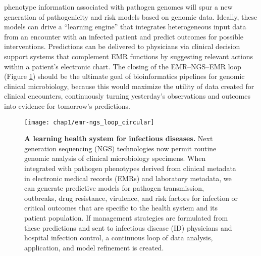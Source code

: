  phenotype information associated with pathogen genomes will spur a new generation of pathogenicity and risk models based on genomic data. Ideally, these models can drive a “learning engine” that integrates heterogeneous input data from an encounter with an infected patient and predict outcomes for possible interventions. Predictions can be delivered to physicians via clinical decision support systems that complement EMR functions by suggesting relevant actions within a patient’s electronic chart. The closing of the EMR–NGS–EMR loop (Figure \ref{fig:emr_ngs_loop}) should be the ultimate goal of bioinformatics pipelines for genomic clinical microbiology, because this would maximize the utility of data created for clinical encounters, continuously turning yesterday’s observations and outcomes into evidence for tomorrow’s predictions.

\begin{figure}[htb]
  \texttt{[image: chap1/emr-ngs\_loop\_circular]}               
  \caption[A learning health system for infectious diseases]{\textbf{A learning health system for infectious diseases.} Next generation sequencing (NGS) technologies now permit routine genomic analysis of clinical microbiology specimens. When integrated with pathogen phenotypes derived from clinical metadata in electronic medical records (EMRs) and laboratory metadata, we can generate predictive models for pathogen transmission, outbreaks, drug resistance, virulence, and risk factors for infection or critical outcomes that are specific to the health system and its patient population. If management strategies are formulated from these predictions and sent to infectious disease (ID) physicians and hospital infection control, a continuous loop of data analysis, application, and model refinement is created.}
  \label{fig:emr_ngs_loop}
\end{figure}

